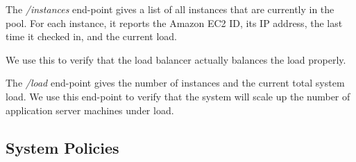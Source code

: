 			The \textit{/instances} end-point gives a list of all instances that are currently in the pool.
			For each instance, it reports the Amazon EC2 ID, its IP address, the last time it checked in, and the current load.
			
			We use this to verify that the load balancer actually balances the load properly.
			
			The \textit{/load} end-point gives the number of instances and the current total system load.
			We use this end-point to verify that the system will scale up the number of application server machines under load.

\subsection{System Policies}
	
